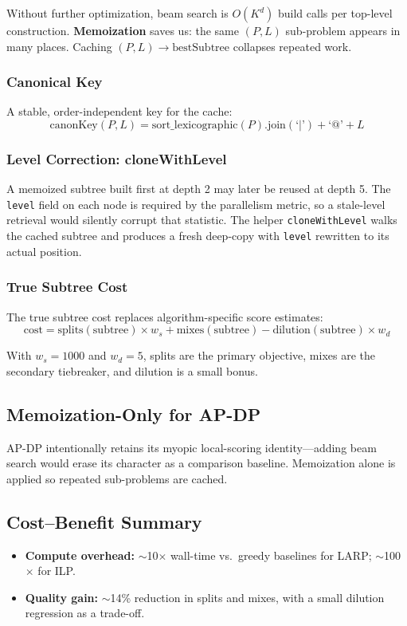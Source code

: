 Without further optimization, beam search is $O(K^d)$ build calls per top-level construction. \textbf{Memoization} saves us: the same $(P, L)$ sub-problem appears in many places. Caching $(P, L) \to \text{bestSubtree}$ collapses repeated work.

\subsubsection{Canonical Key}

A stable, order-independent key for the cache:
$$\text{canonKey}(P, L) = \text{sort\_lexicographic}(P).\text{join}(\texttt{`|'}) + \texttt{`@'} + L$$

\subsubsection{Level Correction: cloneWithLevel}

A memoized subtree built first at depth 2 may later be reused at depth 5. The \texttt{level} field on each node is required by the parallelism metric, so a stale-level retrieval would silently corrupt that statistic. The helper \texttt{cloneWithLevel} walks the cached subtree and produces a fresh deep-copy with \texttt{level} rewritten to its actual position.

\subsubsection{True Subtree Cost}

The true subtree cost replaces algorithm-specific score estimates:
\begin{equation}
\text{cost} = \text{splits}(\text{subtree}) \times w_s + \text{mixes}(\text{subtree}) - \text{dilution}(\text{subtree}) \times w_d
\end{equation}

With $w_s = 1000$ and $w_d = 5$, splits are the primary objective, mixes are the secondary tiebreaker, and dilution is a small bonus.

\subsection{Memoization-Only for AP-DP}

AP-DP intentionally retains its myopic local-scoring identity---adding beam search would erase its character as a comparison baseline. Memoization alone is applied so repeated sub-problems are cached.

\subsection{Cost--Benefit Summary}

\begin{itemize}
    \item \textbf{Compute overhead:} $\sim$10$\times$ wall-time vs.\ greedy baselines for LARP; $\sim$100$\times$ for ILP.
    \item \textbf{Quality gain:} $\sim$14\% reduction in splits and mixes, with a small dilution regression as a trade-off.
\end{itemize}
